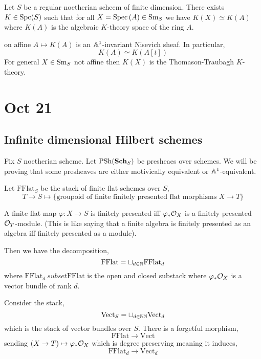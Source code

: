 \documentclass[12pt]{article}
\begin{document}
\begin{theorem}
Let $S$ be a regular noetherian scheem of finite dimension. There exists $K \in \mathrm{Spc}(S)$ such that for all $X = \mathrm{Spec}\left( A \right) \in \mathrm{Sm}_S$ we have $K(X) \simeq K(A)$ where $K(A)$ is the algebraic $K$-theory space of the ring $A$.
\end{theorem}

\begin{rmk}
on affine $A \mapsto K(A)$ is an $\mathbb{A}^1$-invariant Nisevich sheaf. In particular,
\[ K(A) \simeq K(A[t]) \]
For general $X \in \mathrm{Sm}_S$ not affine then $K(X)$ is the Thomason-Traubagh $K$-theory. 
\end{rmk}

\section{Oct 21}

\subsection{Infinite dimensional Hilbert schemes}

\newcommand{\FFlat}{\mathrm{FFlat}}
\newcommand{\Vect}{\mathrm{Vect}}
\newcommand{\Aff}{\mathrm{Aff}}

Fix $S$ noetherian scheme. Let $\mathrm{PSh}(\mathbf{Sch}_S)$ be presheaes over schemes. We will be proving that some presheaves are either motivically equivalent or $\mathbb{A}^1$-equivalent.

\begin{defn}
Let $\FFlat_S$ be the stack of finite flat schemes over $S$,
\[ T \to S \mapsto \{ \text{groupoid of finite finitely presented flat morphisms } X \to T \} \]
\end{defn}

\begin{rmk}
A finite flat map $\varphi : X \to S$ is finitely presented iff $\varphi_* \mathcal{O}_{X}$ is a finitely presented $\mathcal{O}_{T}$-module. (This is like saying that a finite algebra is finitely presented as an algebra iff finitely presented as a module). 
\end{rmk}

\begin{rmk}
Then we have the decomposition,
\[ \FFlat = \sqcup_{d \in \N} \FFlat_d \]
where $\FFlat_d \ subset \FFlat$ is the open and closed substack where $\varphi_* \mathcal{O}_{X}$ is a vector bundle of rank $d$.
\end{rmk}

\begin{defn}
Consider the stack,
\[ \Vect_S = \sqcup_{d \in \NN} \Vect_d \]
which is the stack of vector bundles over $S$. There is a forgetful morphism,
\[ \FFlat \to \Vect \]
sending $(X \to T) \mapsto \varphi_* \mathcal{O}_{X}$ which is degree preserving meaning it induces,
\[ \FFlat_d \to \Vect_d \]
\end{defn}
\end{document}
